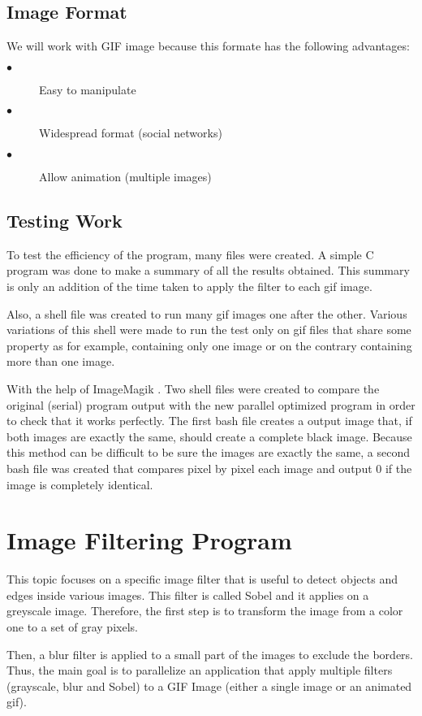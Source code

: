 \documentclass[conference,compsoc]{IEEEtran}
\begin{document}
\subsection{Image Format}
We will work with GIF image because this formate has the following advantages:
\begin{description}
	\item[$\bullet$] Easy to manipulate
	\item[$\bullet$] Widespread format (social networks)
	\item[$\bullet$] Allow animation (multiple images)
\end{description}

\subsection{Testing Work}
To test the efficiency of the program, many files were created. A simple C program was done to make a summary of all the results obtained. This summary is only an addition of the time taken to apply the filter to each gif image.

Also, a shell file was created to run many gif images one after the other. Various variations of this shell were made to run the test only on gif files that share some property as for example, containing only one image or on the contrary containing more than one image.

With the help of ImageMagik \cite{IMAGEMAGICK}. Two shell files were created to compare the original (serial) program output with the new parallel optimized program in order to check that it works perfectly. The first bash file creates a output image that, if both images are exactly the same, should create a complete black image. Because this method can be difficult to be sure the images are exactly the same, a second bash file was created that compares pixel by pixel each image and output 0 if the image is completely identical.

\section{Image Filtering Program}
This topic focuses on a specific image filter that is useful to detect objects and edges inside various images. This filter is called Sobel and it applies on a greyscale image. Therefore, the first step is to transform the image from a color one to a set of gray pixels. 

Then, a blur filter is applied to a small part of the images to exclude the borders. Thus, the main goal is to parallelize an application that apply multiple filters (grayscale, blur and Sobel) to a GIF Image (either a single image or an animated gif). \cite{CoursePage}
\end{document}
